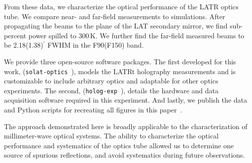 From these data, we characterize the optical performance of the LATR optics tube.  We compare near- and far-field measurements to simulations.  After propagating the beams to the plane of the LAT secondary mirror, we find sub-percent power spilled to 300\,K.  We further find the far-field measured beams to be 2.18(1.38)$^{\prime}$ FWHM in the F90(F150) band.

We provide three open-source software packages.  The first developed for this work, (\verb|solat-optics|~\cite{holog_sim_model}), models the LATRt holography measurements and is customizable to include arbitrary optics and adaptable for other optics experiments.  The second, (\verb|holog-exp|~\cite{holog-exp}), details the hardware and data acquisition software required in this experiment.  And lastly, we publish the data and Python scripts for recreating all figures in this paper~\cite{knowledge}.

The approach demonstrated here is broadly applicable to the characterization of millimeter-wave optical systems.  The ability to characterize the optical performance and systematics of the optics tube allowed us to determine one source of spurious reflections, and avoid systematics during future observations. 